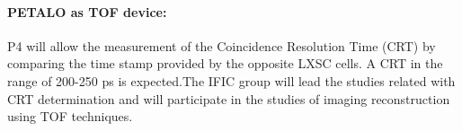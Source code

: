 \paragraph{PETALO as TOF device:}
P4 will allow the measurement of the Coincidence Resolution Time (CRT) by comparing the time stamp provided by the opposite LXSC cells. A CRT in the range of 200-250 ps is expected.The IFIC group will lead the studies related with CRT determination and will participate in the studies of imaging reconstruction using TOF techniques. 



